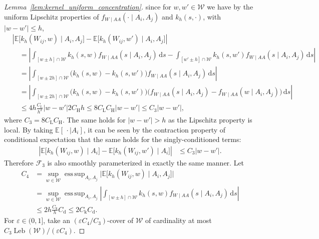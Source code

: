 \documentclass[11pt,lof]{puthesis}
\newcommand{\E}{\ensuremath{\mathbb{E}}}
\newcommand{\rH}{\ensuremath{\mathrm{H}}}
\newcommand{\rL}{\ensuremath{\mathrm{L}}}
\newcommand{\rk}{\ensuremath{\mathrm{k}}}
\newcommand{\rd}{\ensuremath{\mathrm{d}}}
\newcommand{\cF}{\ensuremath{\mathcal{F}}}
\newcommand{\cW}{\ensuremath{\mathcal{W}}}
\DeclareMathOperator*{\esssup}{ess\,sup}
\DeclareMathOperator{\Leb}{Leb}
\newcommand{\diff}[1]{\,\mathrm{d}#1}
\theoremstyle{break}
\theoremstyle{proof}
\newtheorem{proof}{Proof}
\begin{document}
\begin{proof}[Lemma~\ref{lem:kernel_uniform_concentration}]
  since for $w,w' \in \cW$ we have
  by the uniform Lipschitz properties of
  $f_{W \mid AA}(\cdot \mid A_i, A_j)$ and
  $k_h(s, \cdot)$,
  with $|w-w'| \leq h$,
  \begin{align*}
    &\left|
    \E\big[ k_h(W_{i j},w) \mid A_i, A_j \big]
    - \E\big[ k_h(W_{i j},w') \mid A_i, A_j \big]
    \right| \\
    &\quad=
    \left|
    \int_{[w \pm h] \cap \cW}
    k_h(s,w)
    f_{W \mid AA}(s \mid A_i, A_j)
    \diff{s}
    - \int_{[w' \pm h] \cap \cW}
    k_h(s,w')
    f_{W \mid AA}(s \mid A_i, A_j)
    \diff{s}
    \right| \\
    &\quad=
    \left|
    \int_{[w \pm 2h] \cap \cW}
    \big(
      k_h(s,w)
      - k_h(s,w')
    \big)
    f_{W \mid AA}(s \mid A_i, A_j)
    \diff{s}
    \right| \\
    &\quad=
    \left|
    \int_{[w \pm 2h] \cap \cW}
    \big(
      k_h(s,w)
      - k_h(s,w')
    \big)
    \big(
      f_{W \mid AA}(s \mid A_i, A_j)
      - f_{W \mid AA}(w \mid A_i, A_j)
    \big)
    \diff{s}
    \right| \\
    &\quad\leq
    4h
    \frac{C_\rL}{h^2}
    |w-w'|
    2 C_\rH h
    \leq
    8 C_\rL C_\rH
    |w-w'|
    \leq
    C_3
    |w-w'|,
  \end{align*}
  where $C_3 = 8 C_\rL C_\rH$.
  The same holds for $|w-w'| > h$
  as the Lipschitz property is local.
  By taking $\E[\, \cdot \mid A_i]$,
  it can be seen
  by the contraction property of conditional expectation that
  the same holds for the
  singly-conditioned terms:
  \begin{align*}
    \left|
    \E\big[ k_h(W_{i j},w) \mid A_i \big]
    - \E\big[ k_h(W_{i j},w') \mid A_i \big]
    \right|
    &\leq
    C_3
    |w-w'|.
  \end{align*}
  Therefore $\cF_3$ is also smoothly parameterized
  in exactly the same manner.
  Let
  \begin{align*}
    C_4
    &=
    \sup_{w \in \cW}
    \esssup_{A_i, A_j}
    \big|
    \E\big[ k_h(W_{i j},w) \mid A_i, A_j \big]
    \big| \\
    &=
    \sup_{w \in \cW}
    \esssup_{A_i, A_j}
    \left|
    \int_{[w \pm h] \cap \cW}
    k_h(s,w)
    f_{W \mid AA}(s \mid A_i, A_j)
    \diff{s}
    \right| \\
    &\leq 2h \frac{C_\rk}{h} C_\rd
    \leq 2 C_\rk C_\rd.
  \end{align*}
  For $\varepsilon \in (0,1]$,
  take an $(\varepsilon C_4/C_3)$-cover of $\cW$
  of cardinality at most $C_3 \Leb(\cW) / (\varepsilon C_4)$.

\end{proof}
\end{document}
